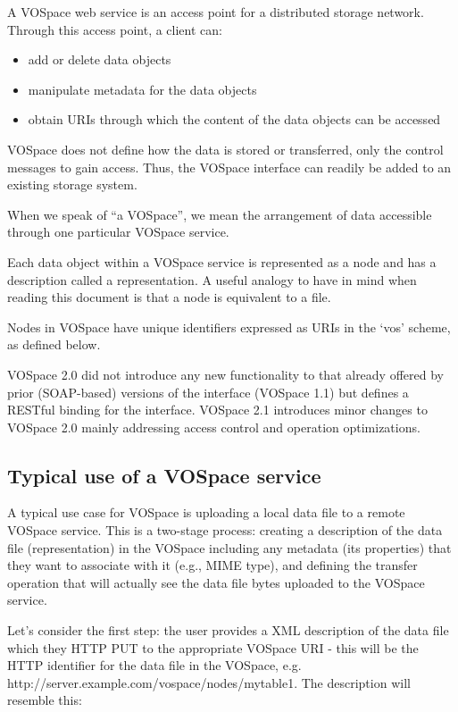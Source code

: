 \documentclass[11pt,a4paper]{ivoa}
\begin{document}
A VOSpace web service is an access point for a distributed storage network. Through this access point, a client can:

\begin{itemize}
    \item add or delete data objects
    \item manipulate metadata for the data objects
    \item obtain URIs through which the content of the data objects can be accessed
\end{itemize}
VOSpace does not define how the data is stored or transferred, only the control messages to gain access. Thus, the VOSpace interface can readily be added to an existing storage system.

When we speak of ``a VOSpace'', we mean the arrangement of data accessible through one particular VOSpace service.

Each data object within a VOSpace service is represented as a node and has a description called a representation. A useful analogy to have in mind when reading this document is that a node is equivalent to a file.

Nodes in VOSpace have unique identifiers expressed as URIs in the `vos' scheme, as defined below.

VOSpace 2.0 did not introduce any new functionality to that already offered by prior (SOAP-based) versions of the interface (VOSpace 1.1) but defines a RESTful binding for the interface. VOSpace 2.1 introduces minor changes to VOSpace 2.0 mainly addressing access control and operation optimizations.

\subsection{Typical use of a VOSpace service}
\label{subsec:typical use of a vospace service}
A typical use case for VOSpace is uploading a local data file to a remote VOSpace service. This is a two-stage process: creating a description of the data file (representation) in the VOSpace including any metadata (its properties) that they want to associate with it (e.g., MIME type), and defining the transfer operation that will actually see the data file bytes uploaded to the VOSpace service.

Let's consider the first step: the user provides a XML description of the data file which they HTTP PUT to the appropriate VOSpace URI - this will be the HTTP identifier for the data file in the VOSpace, e.g. http://server.example.com/vospace/nodes/mytable1. The description will resemble this:
\end{document}
